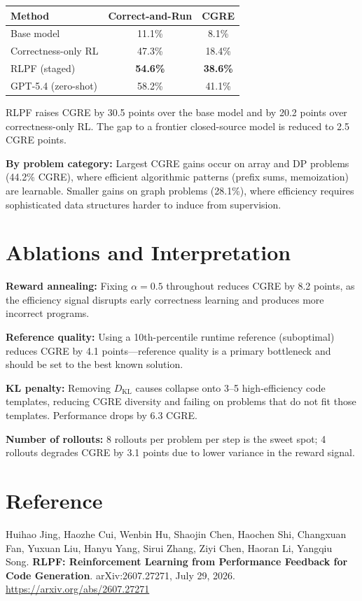\documentclass[10pt,twocolumn]{article}
\begin{document}
\begin{center}\small
\begin{tabular}{lcc}
\toprule
Method & Correct-and-Run & CGRE \\
\midrule
Base model & 11.1\% & 8.1\% \\
Correctness-only RL & 47.3\% & 18.4\% \\
RLPF (staged) & \textbf{54.6\%} & \textbf{38.6\%} \\
GPT-5.4 (zero-shot) & 58.2\% & 41.1\% \\
\bottomrule
\end{tabular}
\end{center}

RLPF raises CGRE by 30.5 points over the base model and by 20.2 points
over correctness-only RL. The gap to a frontier closed-source model is
reduced to 2.5 CGRE points.

\textbf{By problem category:} Largest CGRE gains occur on array and DP
problems (44.2\% CGRE), where efficient algorithmic patterns (prefix sums,
memoization) are learnable. Smaller gains on graph problems (28.1\%),
where efficiency requires sophisticated data structures harder to induce
from supervision.

\section{Ablations and Interpretation}

\textbf{Reward annealing:} Fixing $\alpha = 0.5$ throughout reduces CGRE
by 8.2 points, as the efficiency signal disrupts early correctness learning
and produces more incorrect programs.

\textbf{Reference quality:} Using a 10th-percentile runtime reference
(suboptimal) reduces CGRE by 4.1 points---reference quality is a primary
bottleneck and should be set to the best known solution.

\textbf{KL penalty:} Removing $D_{\mathrm{KL}}$ causes collapse onto 3--5
high-efficiency code templates, reducing CGRE diversity and failing on
problems that do not fit those templates. Performance drops by 6.3 CGRE.

\textbf{Number of rollouts:} 8 rollouts per problem per step is the
sweet spot; 4 rollouts degrades CGRE by 3.1 points due to lower variance
in the reward signal.

\section*{Reference}

Huihao Jing, Haozhe Cui, Wenbin Hu, Shaojin Chen, Haochen Shi,
Changxuan Fan, Yuxuan Liu, Hanyu Yang, Sirui Zhang, Ziyi Chen,
Haoran Li, Yangqiu Song.
\textbf{RLPF: Reinforcement Learning from Performance Feedback for Code
Generation}.
arXiv:2607.27271, July 29, 2026.
\url{https://arxiv.org/abs/2607.27271}
\end{document}
